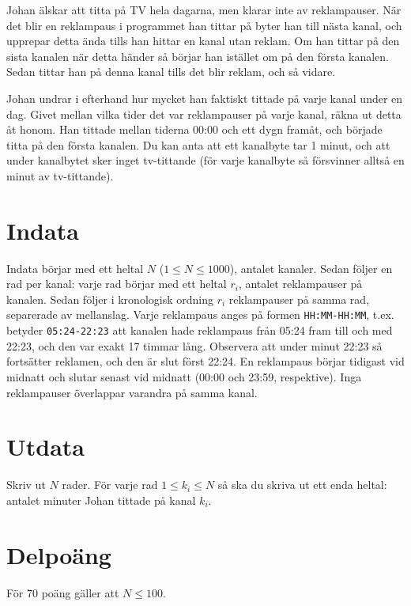 
Johan älskar att titta på TV hela dagarna, men klarar inte av reklampauser. När det blir en reklampaus i programmet han tittar på byter han till nästa kanal, och upprepar detta ända tills han hittar en kanal utan reklam. Om han tittar på den sista kanalen när detta händer så börjar han istället om på den första kanalen. Sedan tittar han på denna kanal tills det blir reklam, och så vidare.

Johan undrar i efterhand hur mycket han faktiskt tittade på varje kanal under en dag. Givet mellan vilka tider det var reklampauser på varje kanal, räkna ut detta åt honom. Han tittade mellan tiderna 00:00 och ett dygn framåt, och började titta på den första kanalen. Du kan anta att ett kanalbyte tar 1 minut, och att under kanalbytet sker inget tv-tittande (för varje kanalbyte så försvinner alltså en minut av tv-tittande).

\section*{Indata}
Indata börjar med ett heltal $N$ ($1 \leq N \leq 1000$), antalet kanaler. Sedan följer en rad per kanal: varje rad börjar med ett heltal $r_i$, antalet reklampauser på kanalen. Sedan följer i kronologisk ordning $r_i$ reklampauser på samma rad, separerade av mellanslag. Varje reklampaus anges på formen \texttt{HH:MM-HH:MM}, t.ex. betyder \texttt{05:24-22:23} att kanalen hade reklampaus från 05:24 fram till och med 22:23, och den var exakt 17 timmar lång. Observera att under minut 22:23 så fortsätter reklamen, och den är slut först 22:24. En reklampaus börjar tidigast vid midnatt och slutar senast vid midnatt (00:00 och 23:59, respektive). Inga reklampauser överlappar varandra på samma kanal.

\section*{Utdata}
Skriv ut $N$ rader. För varje rad $1 \leq k_i \leq N$ så ska du skriva ut ett enda heltal: antalet minuter Johan tittade på kanal $k_i$.

\section*{Delpoäng}
För 70 poäng gäller att $N \leq 100$.
